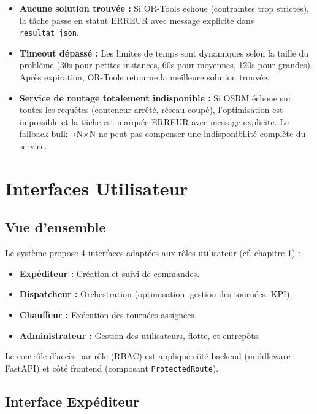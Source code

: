 \documentclass[12pt,a4paper]{report}
\begin{document}
\begin{itemize}[leftmargin=2.2em]
    \item \textbf{Aucune solution trouvée :} Si OR-Tools échoue (contraintes trop strictes), la tâche passe en statut ERREUR avec message explicite dans \texttt{resultat\_json}.
    \item \textbf{Timeout dépassé :} Les limites de temps sont dynamiques selon la taille du problème (30s pour petites instances, 60s pour moyennes, 120s pour grandes). Après expiration, OR-Tools retourne la meilleure solution trouvée.
    \item \textbf{Service de routage totalement indisponible :} Si OSRM échoue sur toutes les requêtes (conteneur arrêté, réseau coupé), l'optimisation est impossible et la tâche est marquée ERREUR avec message explicite. Le fallback bulk→N×N ne peut pas compenser une indisponibilité complète du service.
\end{itemize}

\section{Interfaces Utilisateur}

\subsection{Vue d'ensemble}

Le système propose 4 interfaces adaptées aux rôles utilisateur (cf. chapitre 1) :
\begin{itemize}[leftmargin=2.2em]
    \item \textbf{Expéditeur :} Création et suivi de commandes.
    \item \textbf{Dispatcheur :} Orchestration (optimisation, gestion des tournées, KPI).
    \item \textbf{Chauffeur :} Exécution des tournées assignées.
    \item \textbf{Administrateur :} Gestion des utilisateurs, flotte, et entrepôts.
\end{itemize}

Le contrôle d'accès par rôle (RBAC) est appliqué côté backend (middleware FastAPI) et côté frontend (composant \texttt{ProtectedRoute}).

\subsection{Interface Expéditeur}
\end{document}

